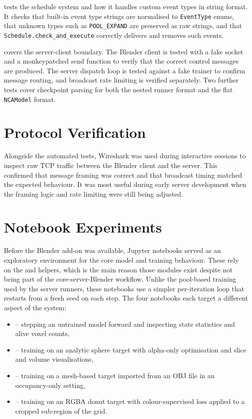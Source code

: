  tests the schedule system and how it handles
custom event types in string format. It checks that built-in event type strings
are normalised to \texttt{EventType} enums, that unknown types such as
\texttt{POOL\_EXPAND} are preserved as raw strings, and that
\texttt{Schedule.check\_and\_execute} correctly delivers and removes such
events.

 covers the server-client boundary. The Blender
client is tested with a fake socket and a monkeypatched send function to verify
that the correct control messages are produced. The server dispatch loop is
tested against a fake trainer to confirm message routing, and broadcast rate
limiting is verified separately. Two further tests cover checkpoint parsing for
both the nested runner format and the flat \texttt{NCAModel} format.

\section{Protocol Verification}

Alongside the automated tests, Wireshark was used during interactive sessions
to inspect raw TCP traffic between the Blender client and the server. This
confirmed that message framing was correct and that broadcast timing matched
the expected behaviour. It was most useful during early server development when
the framing logic and rate limiting were still being adjusted.

\section{Notebook Experiments}

Before the Blender add-on was available, Jupyter notebooks served as an
exploratory environment for the core model and training behaviour. These rely
on the  and  helpers, which is the main reason
those modules exist despite not being part of the core-server-Blender workflow.
Unlike the pool-based training used by the server runners, these notebooks use
a simpler per-iteration loop that restarts from a fresh seed on each step. The
four notebooks each target a different aspect of the system:

\begin{itemize}
    \item {} -- stepping an untrained model
          forward and inspecting state statistics and alive voxel counts,
    \item {} -- training on an analytic
          sphere target with alpha-only optimisation and slice and volume
          visualisations,
    \item {} -- training on a mesh-based
          target imported from an OBJ file in an occupancy-only setting,
    \item {} -- training on an RGBA donut
          target with colour-supervised loss applied to a cropped sub-region
          of the grid.
\end{itemize}


